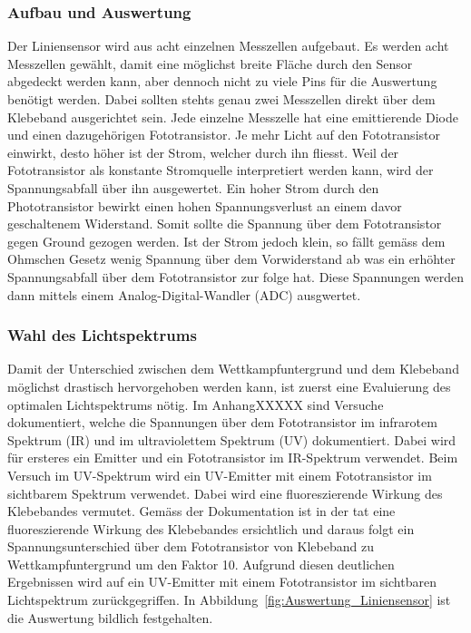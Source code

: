\documentclass[main.tex]{subfiles} %
\begin{document}
\subsubsection{Aufbau und Auswertung}
Der Liniensensor wird aus acht einzelnen Messzellen aufgebaut. Es werden acht Messzellen
gewählt, damit eine möglichst breite Fläche durch den Sensor abgedeckt werden kann, aber
dennoch nicht zu viele Pins für die Auswertung benötigt werden. Dabei sollten stehts genau
zwei Messzellen direkt über dem Klebeband ausgerichtet sein. Jede einzelne Messzelle hat 
eine emittierende Diode und einen dazugehörigen Fototransistor. Je mehr Licht auf den 
Fototransistor einwirkt, desto höher ist der Strom, welcher durch ihn fliesst. Weil der 
Fototransistor als konstante Stromquelle interpretiert werden kann, wird der Spannungsabfall
über ihn ausgewertet. Ein hoher Strom durch den Phototransistor bewirkt einen hohen 
Spannungsverlust an einem davor geschaltenem Widerstand. Somit sollte die Spannung über dem
Fototransistor gegen Ground gezogen werden. Ist der Strom jedoch klein,
so fällt gemäss dem Ohmschen Gesetz wenig Spannung über dem Vorwiderstand ab was ein erhöhter
Spannungsabfall über dem Fototransistor zur folge hat. Diese Spannungen werden dann mittels einem
Analog-Digital-Wandler (ADC) ausgwertet.

\subsubsection{Wahl des Lichtspektrums}
Damit der Unterschied zwischen dem Wettkampfuntergrund und dem Klebeband möglichst 
drastisch hervorgehoben werden kann, ist zuerst eine Evaluierung des optimalen
Lichtspektrums nötig. Im AnhangXXXXX sind Versuche dokumentiert, welche die Spannungen 
über dem Fototransistor im infrarotem Spektrum (IR) und im ultraviolettem Spektrum (UV) 
dokumentiert. Dabei wird für ersteres ein Emitter und ein Fototransistor im IR-Spektrum
verwendet. Beim Versuch im UV-Spektrum wird ein UV-Emitter mit einem Fototransistor 
im sichtbarem Spektrum verwendet. Dabei wird eine fluoreszierende Wirkung des Klebebandes 
vermutet. Gemäss der Dokumentation ist in der tat eine fluoreszierende Wirkung des Klebebandes 
ersichtlich und daraus folgt ein Spannungsunterschied über dem Fototransistor von Klebeband 
zu Wettkampfuntergrund um den Faktor 10. Aufgrund diesen deutlichen Ergebnissen wird auf ein 
UV-Emitter mit einem Fototransistor im sichtbaren Lichtspektrum zurückgegriffen.
In Abbildung~\ref{fig:Auswertung_Liniensensor} ist die Auswertung bildlich festgehalten.
\end{document}
